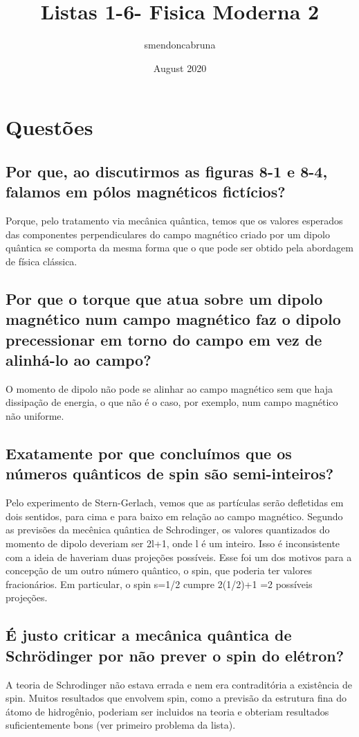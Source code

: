 \documentclass{article}
\title{Listas 1-6- Fisica Moderna 2}
\author{smendoncabruna }
\date{August 2020}
\begin{document}
\maketitle

\section{Questões}
\subsection{Por que, ao discutirmos as figuras 8-1 e 8-4, falamos em pólos magnéticos fictícios?}

Porque, pelo tratamento via mecânica quântica, temos que os valores esperados das componentes perpendiculares do campo magnético criado por um dipolo quântica se comporta da mesma forma que o que pode ser obtido pela abordagem de física clássica.

\subsection{Por que o torque que atua sobre um dipolo magnético num campo magnético faz o dipolo precessionar em torno do campo em vez de alinhá-lo ao campo?}

O momento de dipolo não pode se alinhar ao campo magnético sem que haja dissipação de energia, o que não é o caso, por exemplo, num campo magnético não uniforme.

\subsection{Exatamente por que concluímos que os números quânticos de spin são semi-inteiros?}
Pelo experimento de Stern-Gerlach, vemos que as partículas serão defletidas em dois sentidos, para cima e para baixo em relação ao campo magnético. Segundo as previsões da mecênica quântica de Schrodinger, os valores quantizados do momento de dipolo deveriam ser 2l+1, onde l é um inteiro. Isso é inconsistente com a ideia de haveriam duas projeções possíveis. Esse foi um dos motivos para a concepção de um outro número quântico, o spin, que poderia ter valores fracionários. Em particular, o spin s=1/2 cumpre 2(1/2)+1 =2 possíveis projeções.

\subsection{É justo criticar a mecânica quântica de Schrödinger por não prever o spin do elétron?}
A teoria de Schrodinger não estava errada e nem era contraditória a existência de spin. Muitos resultados que envolvem spin, como a previsão da estrutura fina do átomo de hidrogênio, poderiam ser incluidos na teoria e obteriam resultados suficientemente bons (ver primeiro problema da lista).
\end{document}
